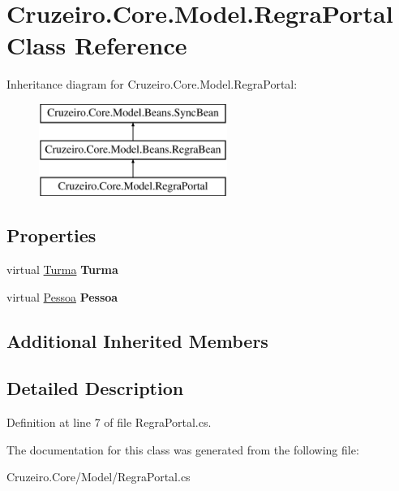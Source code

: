 \hypertarget{class_cruzeiro_1_1_core_1_1_model_1_1_regra_portal}{}\section{Cruzeiro.\+Core.\+Model.\+Regra\+Portal Class Reference}
\label{class_cruzeiro_1_1_core_1_1_model_1_1_regra_portal}
Inheritance diagram for Cruzeiro.\+Core.\+Model.\+Regra\+Portal\+:\begin{figure}[H]
\begin{center}
\leavevmode
\includegraphics[height=3.000000cm]{class_cruzeiro_1_1_core_1_1_model_1_1_regra_portal}
\end{center}
\end{figure}
\subsection*{Properties}
\begin{DoxyCompactItemize}
\item 
virtual \hyperlink{class_cruzeiro_1_1_core_1_1_model_1_1_turma}{Turma} {\bfseries Turma}\hypertarget{class_cruzeiro_1_1_core_1_1_model_1_1_regra_portal_adf0e66020b4db7e34f6b466e66e9827c}{}\label{class_cruzeiro_1_1_core_1_1_model_1_1_regra_portal_adf0e66020b4db7e34f6b466e66e9827c}

\item 
virtual \hyperlink{class_cruzeiro_1_1_core_1_1_model_1_1_pessoa}{Pessoa} {\bfseries Pessoa}\hypertarget{class_cruzeiro_1_1_core_1_1_model_1_1_regra_portal_a3c7db7715d36dce96cdb7e5e2880a063}{}\label{class_cruzeiro_1_1_core_1_1_model_1_1_regra_portal_a3c7db7715d36dce96cdb7e5e2880a063}

\end{DoxyCompactItemize}
\subsection*{Additional Inherited Members}


\subsection{Detailed Description}


Definition at line 7 of file Regra\+Portal.\+cs.



The documentation for this class was generated from the following file\+:\begin{DoxyCompactItemize}
\item 
Cruzeiro.\+Core/\+Model/Regra\+Portal.\+cs\end{DoxyCompactItemize}
